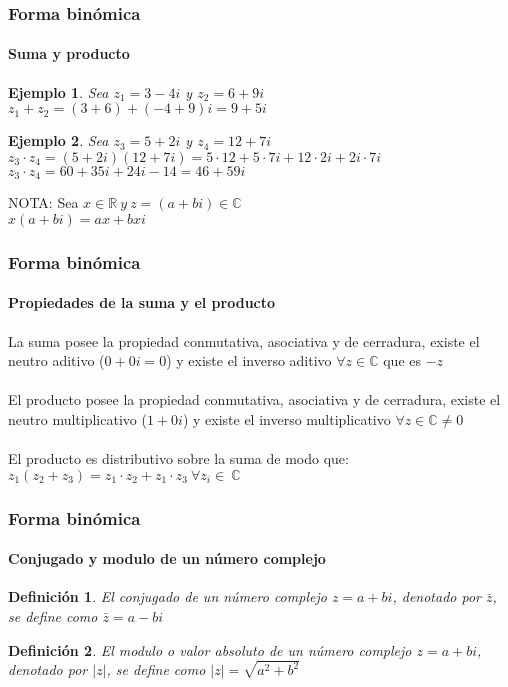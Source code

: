 \documentclass[11pt]{beamer}
\newtheorem{defi}{Definición}
\newtheorem{ejem}{Ejemplo}
\begin{document}
\begin{frame}
\frametitle{Forma binómica}
\framesubtitle{Suma y producto}
\begin{ejem}
Sea $z_1 = 3 - 4i$ y $z_2 = 6 + 9i$\\ 
$z_1 + z_2 = (3 + 6)+(-4 + 9)i = 9 + 5i$
\end{ejem}
\begin{ejem}
Sea $z_3 = 5 + 2i$ y $z_4 = 12 + 7i$\\ 
$z_3 \cdot z_4 = (5+2i)(12+7i) = 5\cdot 12 + 5\cdot 7i + 12\cdot 2i + 2i\cdot 7i$\\
$z_3\cdot z_4 = 60+35i+24i-14 = 46+59i$\\
\end{ejem}
NOTA: Sea $x\in \mathbb{R}~y~z = (a+bi)\in \mathbb{C}$\\
$x(a+bi) = ax + bxi$
\end{frame}

\begin{frame}
\frametitle{Forma binómica}
\framesubtitle{Propiedades de la suma y el producto}
La suma posee la propiedad conmutativa, asociativa y de cerradura, existe el neutro aditivo ($0 + 0i = 0$) y existe el inverso aditivo $\forall z\in \mathbb{C} $ que es $-z$\\ \hspace{0cm} \\
El producto posee la propiedad conmutativa, asociativa y de cerradura, existe el neutro multiplicativo ($1 + 0i$) y existe el inverso multiplicativo $\forall z\in \mathbb{C} \neq 0$\\ \hspace{0cm} \\
El producto es distributivo sobre la suma de modo que:\\
$z_1(z_2+z_3)=z_1\cdot z_2 + z_1\cdot z_3~\forall z_i\in~\mathbb{C}$
\end{frame}

\begin{frame}
\frametitle{Forma binómica}
\framesubtitle{Conjugado y modulo de un número complejo}
\begin{defi}
El conjugado de un número complejo $z=a+bi$, denotado por $\bar{z}$, se define como $\bar{z}=a-bi$
\end{defi}
\begin{defi}
El modulo o valor absoluto de un número complejo $z=a+bi$, denotado por $|z|$, se define como $|z|=\sqrt{a^2+b^2}$
\end{defi}
\end{frame}
\end{document}
